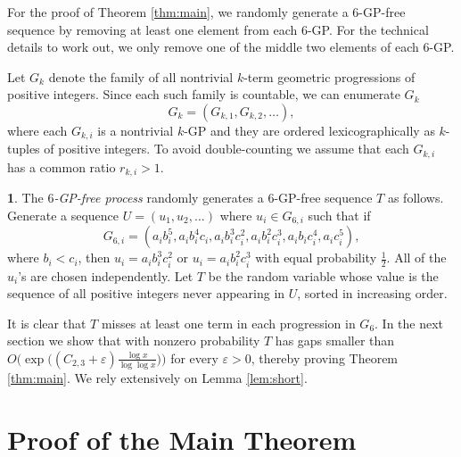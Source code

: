 \documentclass[12pt,english,BCOR7.5mm]{amsart}
\numberwithin{equation}{section}
\numberwithin{figure}{section}
\theoremstyle{definition}
\theoremstyle{plain}
\theoremstyle{plain}
\theoremstyle{plain}
\theoremstyle{definition}
\newtheorem{defn}[thm]{\protect\definitionname}
\theoremstyle{plain}
\theoremstyle{plain}
\providecommand{\definitionname}{Definition}
\begin{document}
For the proof of Theorem \ref{thm:main}, we randomly generate a $6$-GP-free
sequence by removing at least one element from each $6$-GP. For the
technical details to work out, we only remove one of the middle two
elements of each $6$-GP.

Let $G_{k}$ denote the family of all nontrivial $k$-term geometric
progressions of positive integers. Since each such family is countable,
we can enumerate $G_{k}$
\[
G{}_{k}=(G_{k,1},G_{k,2},\ldots),
\]
where each $G_{k,i}$ is a nontrivial $k$-GP and they are ordered
lexicographically as $k$-tuples of positive integers. To avoid double-counting
we assume that each $G_{k,i}$ has a common ratio $r_{k,i}>1$.
\begin{defn}
\label{6-gp}The \emph{$6$-GP-free process} randomly generates a
$6$-GP-free sequence $T$ as follows. Generate a sequence $U=(u_{1},u_{2},\ldots)$
where $u_{i}\in G_{6,i}$ such that if
\[
G_{6,i}=(a_{i}b_{i}^{5},a_{i}b_{i}^{4}c_{i},a_{i}b_{i}^{3}c_{i}^{2},a_{i}b_{i}^{2}c_{i}^{3},a_{i}b_{i}c_{i}^{4},a_{i}c_{i}^{5}),
\]
where $b_{i}<c_{i}$, then $u_{i}=a_{i}b_{i}^{3}c_{i}^{2}$ or $u_{i}=a_{i}b_{i}^{2}c_{i}^{3}$
with equal probability $\frac{1}{2}$. All of the $u_{i}$'s are chosen
independently. Let $T$ be the random variable whose value is the
sequence of all positive integers never appearing in $U$, sorted
in increasing order.
\end{defn}
It is clear that $T$ misses at least one term in each progression
in $G_{6}$. In the next section we show that with nonzero probability
$T$ has gaps smaller than $O\Big(\exp\Big((C_{2,3}+\varepsilon)\frac{\log x}{\log\log x}\Big)\Big)$
for every $\varepsilon>0$, thereby proving Theorem \ref{thm:main}.
We rely extensively on Lemma \ref{lem:short}.

\section*{Proof of the Main Theorem}
\end{document}
